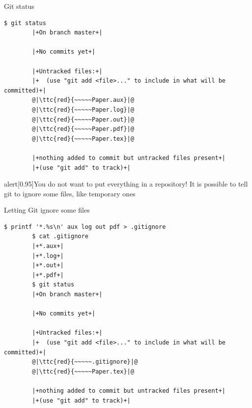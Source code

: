 \documentclass[usenames,svgnames,14pt]{beamer}
\newcommand{\ttc}[2]{\texttt{\textcolor{#1}{#2}}}
\begin{document}
\begin{frame}[fragile]{Git status}
    \begin{lstlisting}[style=MyBash]
        $ git status
        |+On branch master+|

        |+No commits yet+|

        |+Untracked files:+|
        |+  (use "git add <file>..." to include in what will be committed)+|
        @|\ttc{red}{~~~~~Paper.aux}|@
        @|\ttc{red}{~~~~~Paper.log}|@
        @|\ttc{red}{~~~~~Paper.out}|@
        @|\ttc{red}{~~~~~Paper.pdf}|@
        @|\ttc{red}{~~~~~Paper.tex}|@

        |+nothing added to commit but untracked files present+|
        |+(use "git add" to track)+|
    \end{lstlisting}
    \begin{varblock}{alert}[0.95\textwidth]{You do not want to put everything in a repository!}
        It is possible to tell git to ignore some files, like temporary ones
    \end{varblock}
\end{frame}
\begin{frame}[fragile]{Letting Git ignore some files}
    \begin{lstlisting}[style=MyBash]
        $ printf '*.%s\n' aux log out pdf > .gitignore
        $ cat .gitignore
        |+*.aux+|
        |+*.log+|
        |+*.out+|
        |+*.pdf+|
        $ git status
        |+On branch master+|

        |+No commits yet+|

        |+Untracked files:+|
        |+  (use "git add <file>..." to include in what will be committed)+|
        @|\ttc{red}{~~~~~.gitignore}|@
        @|\ttc{red}{~~~~~Paper.tex}|@

        |+nothing added to commit but untracked files present+|
        |+(use "git add" to track)+|
    \end{lstlisting}
    \begin{center}
        \qquad
    \end{center}
\end{frame}
\end{document}
